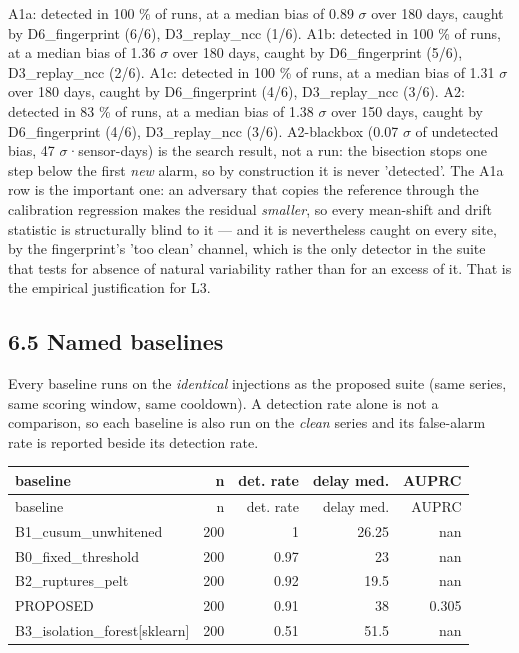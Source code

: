 \documentclass[10pt,a4paper]{article}
\begin{document}
A1a: detected in 100 \% of runs, at a median bias of 0.89 $\sigma$ over 180 days, caught by D6\_\allowbreak{}fingerprint (6/\allowbreak{}6), D3\_\allowbreak{}replay\_\allowbreak{}ncc (1/\allowbreak{}6). A1b: detected in 100 \% of runs, at a median bias of 1.36 $\sigma$ over 180 days, caught by D6\_\allowbreak{}fingerprint (5/\allowbreak{}6), D3\_\allowbreak{}replay\_\allowbreak{}ncc (2/\allowbreak{}6). A1c: detected in 100 \% of runs, at a median bias of 1.31 $\sigma$ over 180 days, caught by D6\_\allowbreak{}fingerprint (4/\allowbreak{}6), D3\_\allowbreak{}replay\_\allowbreak{}ncc (3/\allowbreak{}6). A2: detected in 83 \% of runs, at a median bias of 1.38 $\sigma$ over 150 days, caught by D6\_\allowbreak{}fingerprint (4/\allowbreak{}6), D3\_\allowbreak{}replay\_\allowbreak{}ncc (3/\allowbreak{}6). A2-\allowbreak{}blackbox (0.07 $\sigma$ of undetected bias, 47 $\sigma$·sensor-\allowbreak{}days) is the search result, not a run: the bisection stops one step below the first \emph{new} alarm, so by construction it is never 'detected'. The A1a row is the important one: an adversary that copies the reference through the calibration regression makes the residual \emph{smaller}, so every mean-\allowbreak{}shift and drift statistic is structurally blind to it — and it is nevertheless caught on every site, by the fingerprint's 'too clean' channel, which is the only detector in the suite that tests for absence of natural variability rather than for an excess of it. That is the empirical justification for L3.

\subsection*{6.5 Named baselines}
Every baseline runs on the \emph{identical} injections as the proposed suite (same series, same scoring window, same cooldown). A detection rate alone is not a comparison, so each baseline is also run on the \emph{clean} series and its false-\allowbreak{}alarm rate is reported beside its detection rate.

{\small
\setlength{\tabcolsep}{4.5pt}
\setlength{\LTleft}{\fill}
\setlength{\LTright}{\fill}
\begin{longtable}{lrrrr}
\toprule
baseline & n & det. rate & delay med. & AUPRC \\
\midrule
\endfirsthead
\toprule
baseline & n & det. rate & delay med. & AUPRC \\
\midrule
\endhead
\bottomrule
\endlastfoot
B1\_\allowbreak{}cusum\_\allowbreak{}unwhitened & 200 & 1 & 26.25 & nan \\
B0\_\allowbreak{}fixed\_\allowbreak{}threshold & 200 & 0.97 & 23 & nan \\
B2\_\allowbreak{}ruptures\_\allowbreak{}pelt & 200 & 0.92 & 19.5 & nan \\
PROPOSED & 200 & 0.91 & 38 & 0.305 \\
B3\_\allowbreak{}isolation\_\allowbreak{}forest[sklearn] & 200 & 0.51 & 51.5 & nan \\
\end{longtable}
}
\end{document}

